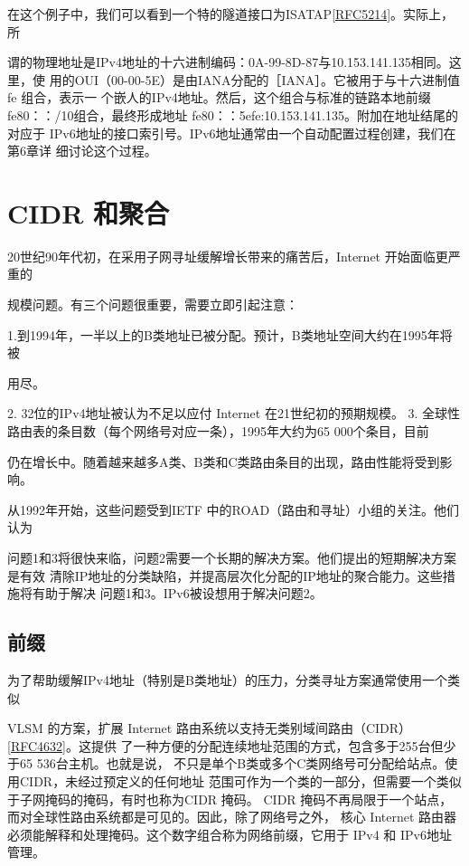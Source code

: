 在这个例子中，我们可以看到一个特的隧道接口为ISATAP\href{https://www.rfc-editor.org/rfc/rfc5214}{[RFC5214]}。实际上，所

谓的物理地址是IPv4地址的十六进制编码：0A-99-8D-87与10.153.141.135相同。这里，使
用的OUI（00-00-5E）是由IANA分配的［IANA］。它被用于与十六进制值 fe 组合，表示一
个嵌人的IPv4地址。然后，这个组合与标准的链路本地前缀fe80：：/10组合，最终形成地址
fe80：：5efe:10.153.141.135。附加在地址结尾的%
对应于 IPv6地址的接口索引号。IPv6地址通常由一个自动配置过程创建，我们在第6章详
细讨论这个过程。

\section{CIDR 和聚合}
20世纪90年代初，在采用子网寻址缓解增长带来的痛苦后，Internet 开始面临更严重的

规模问题。有三个问题很重要，需要立即引起注意：

1.到1994年，一半以上的B类地址已被分配。预计，B类地址空间大约在1995年将被

用尽。

2. 32位的IPv4地址被认为不足以应付 Internet 在21世纪初的预期规模。
3. 全球性路由表的条目数（每个网络号对应一条），1995年大约为65 000个条目，目前

仍在增长中。随着越来越多A类、B类和C类路由条目的出现，路由性能将受到影响。

从1992年开始，这些问题受到IETF 中的ROAD（路由和寻址）小组的关注。他们认为

问题1和3将很快来临，问题2需要一个长期的解决方案。他们提出的短期解决方案是有效
清除IP地址的分类缺陷，并提高层次化分配的IP地址的聚合能力。这些措施将有助于解决
问题1和3。IPv6被设想用于解决问题2。

\subsection{前缀}
为了帮助缓解IPv4地址（特别是B类地址）的压力，分类寻址方案通常使用一个类似

VLSM 的方案，扩展 Internet 路由系统以支持无类别域间路由（CIDR）\href{https://www.rfc-editor.org/rfc/rfc4632}{[RFC4632]}。这提供
了一种方便的分配连续地址范围的方式，包含多于255台但少于65 536台主机。也就是说，
不只是单个B类或多个C类网络号可分配给站点。使用CIDR，未经过预定义的任何地址
范围可作为一个类的一部分，但需要一个类似于子网掩码的掩码，有时也称为CIDR 掩码。
CIDR 掩码不再局限于一个站点，而对全球性路由系统都是可见的。因此，除了网络号之外，
核心 Internet 路由器必须能解释和处理掩码。这个数字组合称为网络前缀，它用于 IPv4 和
IPv6地址管理。

